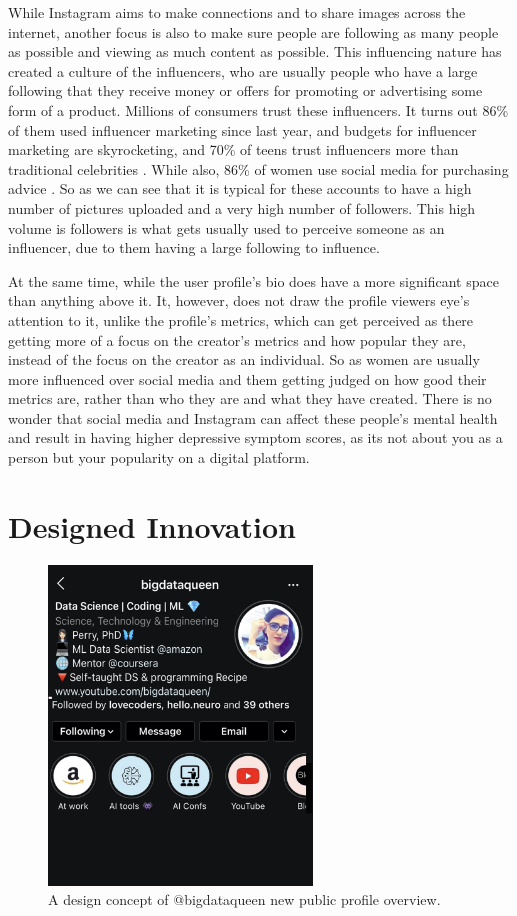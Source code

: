 \documentclass{sigchi}
\begin{document}
	While Instagram aims to make connections and to share images across the internet, another focus is also to make sure people are following as many people as possible and viewing as much content as possible. This influencing nature has created a culture of the influencers, who are usually people who have a large following that they receive money or offers for promoting or advertising some form of a product. Millions of consumers trust these influencers. It turns out 86\% of them used influencer marketing since last year, and budgets for influencer marketing are skyrocketing, and 70\% of teens trust influencers more than traditional celebrities \cite{influencers}.  While also, 86\% of women use social media for purchasing advice \cite{influencers}. So as we can see that it is typical for these accounts to have a high number of pictures uploaded and a very high number of followers. This high volume is followers is what gets usually used to perceive someone as an influencer, due to them having a large following to influence.
	
	At the same time, while the user profile's bio does have a more significant space than anything above it. It, however, does not draw the profile viewers eye's attention to it, unlike the profile's metrics, which can get perceived as there getting more of a focus on the creator's metrics and how popular they are, instead of the focus on the creator as an individual. So as women are usually more influenced over social media and them getting judged on how good their metrics are, rather than who they are and what they have created. There is no wonder that social media and Instagram can affect these people's mental health and result in having higher depressive symptom scores, as its not about you as a person but your popularity on a digital platform.

\section{Designed Innovation}

\begin{figure}
	\begin{center}
		\includegraphics[width=7cm]{instagram_example2.jpg}
		\caption{A design concept of @bigdataqueen new public profile overview.}
		\label{fig:instagram_new_overview}
	\end{center}
\end{figure}
\end{document}
